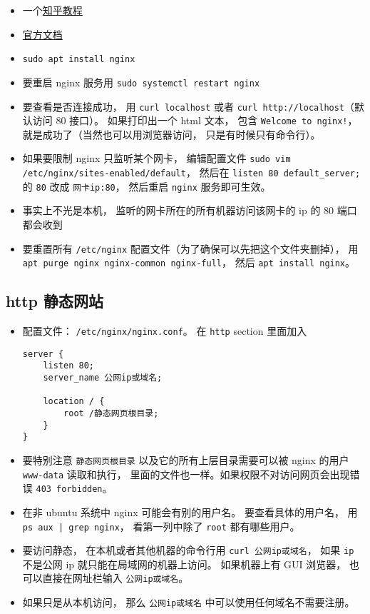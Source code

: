 
\begin{issues}
\issueDraft
\end{issues}

\begin{itemize}
\item 一个\href{https://zhuanlan.zhihu.com/p/80600540}{知乎教程}
\item \href{https://nginx.org/en/docs/}{官方文档}
\item \verb|sudo apt install nginx|
\item 要重启 nginx 服务用 \verb|sudo systemctl restart nginx|
\item 要查看是否连接成功， 用 \verb|curl localhost| 或者 \verb|curl http://localhost|（默认访问 80 接口）。 如果打印出一个 html 文本， 包含 \verb|Welcome to nginx!|， 就是成功了（当然也可以用浏览器访问， 只是有时候只有命令行）。
\item 如果要限制 nginx 只监听某个网卡， 编辑配置文件 \verb|sudo vim /etc/nginx/sites-enabled/default|， 然后在 \verb|listen 80 default_server;| 的 \verb|80| 改成 \verb|网卡ip:80|， 然后重启 \verb|nginx| 服务即可生效。
\item 事实上不光是本机， 监听的网卡所在的所有机器访问该网卡的 ip 的 80 端口都会收到
\item 要重置所有 \verb|/etc/nginx| 配置文件（为了确保可以先把这个文件夹删掉）， 用 \verb|apt purge nginx nginx-common nginx-full|， 然后 \verb|apt install nginx|。
\end{itemize}

\subsection{http 静态网站}
\begin{itemize}
\item 配置文件： \verb|/etc/nginx/nginx.conf|。 在 \verb|http| section 里面加入
\begin{lstlisting}[language=none]
server {
    listen 80;
    server_name 公网ip或域名;
    
    location / {
        root /静态网页根目录;
    }
}
\end{lstlisting}
\item 要特别注意 \verb|静态网页根目录| 以及它的所有上层目录需要可以被 nginx 的用户 \verb|www-data| 读取和执行， 里面的文件也一样。如果权限不对访问网页会出现错误 \verb|403 forbidden|。
\item 在非 ubuntu 系统中 nginx 可能会有别的用户名。  要查看具体的用户名， 用 \verb`ps aux | grep nginx`， 看第一列中除了 \verb|root| 都有哪些用户。
\item 要访问静态， 在本机或者其他机器的命令行用 \verb|curl 公网ip或域名|， 如果 \verb|ip| 不是公网 ip 就只能在局域网的机器上访问。 如果机器上有 GUI 浏览器， 也可以直接在网址栏输入 \verb|公网ip或域名|。
\item 如果只是从本机访问， 那么 \verb|公网ip或域名| 中可以使用任何域名不需要注册。
\end{itemize}

